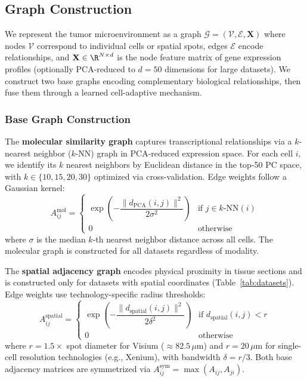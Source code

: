 \documentclass{article}
\begin{document}
\subsection{Graph Construction}

We represent the tumor microenvironment as a graph $\mathcal{G} = (\mathcal{V}, \mathcal{E}, \mathbf{X})$ where nodes $\mathcal{V}$ correspond to individual cells or spatial spots, edges $\mathcal{E}$ encode relationships, and $\mathbf{X} \in \R^{N \times d}$ is the node feature matrix of gene expression profiles (optionally PCA-reduced to $d = 50$ dimensions for large datasets). We construct two base graphs encoding complementary biological relationships, then fuse them through a learned cell-adaptive mechanism.

\subsubsection{Base Graph Construction}

The \textbf{molecular similarity graph} captures transcriptional relationships via a $k$-nearest neighbor ($k$-NN) graph in PCA-reduced expression space. For each cell $i$, we identify its $k$ nearest neighbors by Euclidean distance in the top-50 PC space, with $k \in \{10, 15, 20, 30\}$ optimized via cross-validation. Edge weights follow a Gaussian kernel:
\begin{equation}
    A^{\text{mol}}_{ij} =
    \begin{cases}
        \exp\!\left(-\dfrac{\|d_{\text{PCA}}(i,j)\|^2}{2\sigma^2}\right) & \text{if } j \in k\text{-NN}(i) \\[6pt]
        0 & \text{otherwise}
    \end{cases}
    \label{eq:mol_graph}
\end{equation}
where $\sigma$ is the median $k$-th nearest neighbor distance across all cells. The molecular graph is constructed for all datasets regardless of modality.

The \textbf{spatial adjacency graph} encodes physical proximity in tissue sections and is constructed only for datasets with spatial coordinates (Table~\ref{tab:datasets}). Edge weights use technology-specific radius thresholds:
\begin{equation}
    A^{\text{spatial}}_{ij} =
    \begin{cases}
        \exp\!\left(-\dfrac{\|d_{\text{spatial}}(i,j)\|^2}{2\delta^2}\right) & \text{if } d_{\text{spatial}}(i,j) < r \\[6pt]
        0 & \text{otherwise}
    \end{cases}
    \label{eq:spatial_graph}
\end{equation}
where $r = 1.5 \times$ spot diameter for Visium (${\approx}82.5\,\mu$m) and $r = 20\,\mu$m for single-cell resolution technologies (e.g., Xenium), with bandwidth $\delta = r/3$. Both base adjacency matrices are symmetrized via $A^{\text{sym}}_{ij} = \max(A_{ij}, A_{ji})$.
\end{document}
